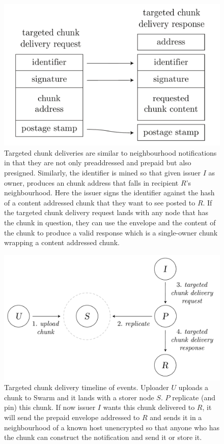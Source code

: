 \begin{figure}[htbp]
\centering
\includegraphics[width=.6\textwidth]{fig/targeted-chunk-delivery.pdf}      
\caption[Targeted chunk deliveries \statusgreen]{Targeted chunk deliveries are similar to neighbourhood notifications in that they are not only preaddressed and prepaid but also presigned. Similarly, the identifier is mined so that given issuer $I$ as owner, produces an chunk address that falls in recipient $R$'s neighbourhood. Here the issuer signs the identifier against the hash of a content addressed chunk that they want to see posted to $R$. If the targeted chunk delivery request lands with any node that has the chunk in question, they can use the envelope and the content of the chunk to produce a valid response which is a single-owner chunk wrapping a content addressed chunk.}
\label{fig:targeted-chunk-delivery}
\end{figure}

\begin{figure}[htbp]
\centering
\includegraphics[width=.8\textwidth]{fig/targeted-chunk-delivery-events.pdf}
\caption[Targeted chunk delivery timeline of events\statusgreen]{Targeted chunk delivery timeline of events. Uploader $U$ uploads a chunk to Swarm and it lands with a storer node $S$. $P$ replicate (and pin) this chunk. If now issuer $I$ wants this chunk delivered to $R$, it will send the prepaid envelope addressed to $R$ and sends it in a neighbourhood of a known host unencrypted so that anyone who has the chunk can construct the notification and send it or store it.}
\label{fig:targeted-chunk-delivery-events}
\end{figure}



